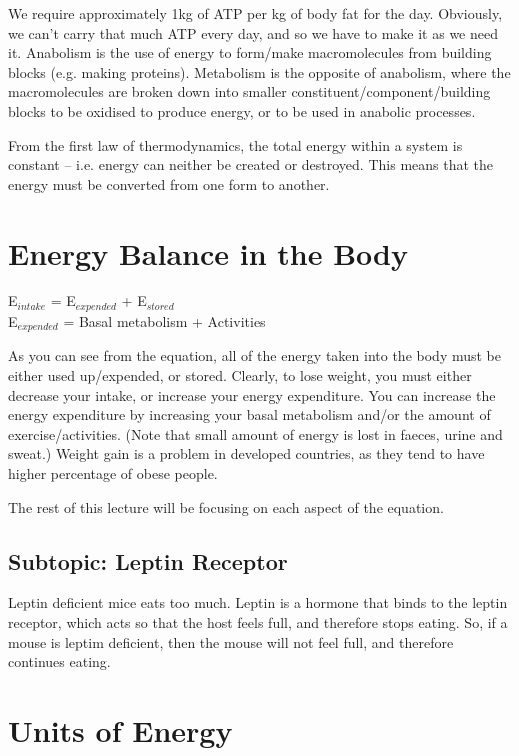 \documentclass[a4paper, 12pt]{report}
\begin{document}
We require approximately 1kg of ATP per kg of body fat for the day.
Obviously, we can't carry that much ATP every day, and so we have to make it as we need it.
Anabolism is the use of energy to form/make macromolecules from building blocks (e.g. making proteins).
Metabolism is the opposite of anabolism, where the macromolecules are broken down into smaller constituent/component/building blocks to be oxidised to produce energy, or to be used in anabolic processes.

From the first law of thermodynamics, the total energy within a system is constant -- i.e. energy can neither be created or destroyed.
This means that the energy must be converted from one form to another.

\section{Energy Balance in the Body}

\begin{center}
E$_{intake}$ = E$_{expended}$ + E$_{stored}$\\
\vspace{0.5cm}
E$_{expended}$ = Basal metabolism + Activities
\end{center}

As you can see from the equation, all of the energy taken into the body must be either used up/expended, or stored.
Clearly, to lose weight, you must either decrease your intake, or increase your energy expenditure.
You can increase the energy expenditure by increasing your basal metabolism and/or the amount of exercise/activities.
(Note that small amount of energy is lost in faeces, urine and sweat.)
Weight gain is a problem in developed countries, as they tend to have higher percentage of obese people.

The rest of this lecture will be focusing on each aspect of the equation.

\subsection{Subtopic: Leptin Receptor}

Leptin deficient mice eats too much.
Leptin is a hormone that binds to the leptin receptor, which acts so that the host feels full, and therefore stops eating.
So, if a mouse is leptim deficient, then the mouse will not feel full, and therefore continues eating.

\section{Units of Energy}
\end{document}
